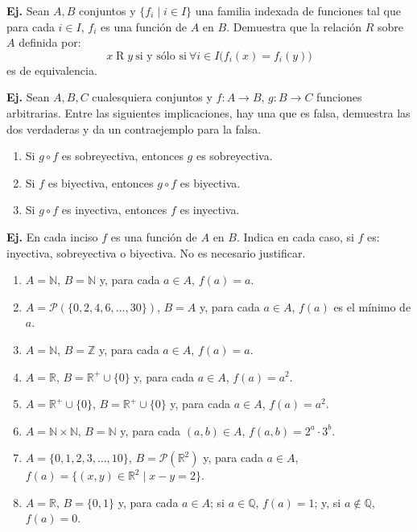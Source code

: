 \documentclass[letterpaper,DIV=14,headsepline,12pt]{scrartcl}
\providecommand\st{\;|\;}
\newcounter{Ejer}
\newcommand{\pts}{}
\newenvironment{ejercicio}[1]{\noindent
    \ifthenelse{\equal{#1}{1}}{\renewcommand{\pts}{\textbf{(#1 pt)}}}{\renewcommand{\pts}{\textbf{(#1 pts)}}}\textbf{Ej. \theEjer} \pts\stepcounter{Ejer}}{\vspace{.3cm}}
\begin{document}
    \begin{ejercicio}{1}
        Sean $A,B$ conjuntos y $\{f_i \st i\in I\}$ una familia indexada de funciones tal que para cada $i \in I$, $f_i$ es una función de $A$ en $B$. Demuestra que la relación $R$ sobre $A$ definida por:
        \[ x \mathrel{R} y \: \text{si y sólo si} \: \forall i \in I \big( f_i(x)=f_i(y) \big) \]
        es de equivalencia.
    \end{ejercicio}

    \begin{ejercicio}{1}
        Sean $A,B,C$ cualesquiera conjuntos y $f\colon A \to B$, $g\colon B \to C$ funciones arbitrarias. Entre las siguientes implicaciones, hay una que es falsa, demuestra las dos verdaderas y da un contraejemplo para la falsa.
        \begin{enumerate}
            \item Si $g \circ f$ es sobreyectiva, entonces $g$ es sobreyectiva.
            \item Si $f$ es biyectiva, entonces $g \circ f$ es biyectiva.
            \item Si $g \circ f$ es inyectiva, entonces $f$ es inyectiva.
        \end{enumerate}
    \end{ejercicio}

    \begin{ejercicio}{1}
        En cada inciso $f$ es una función de $A$ en $B$. Indica en cada caso, si $f$ es: inyectiva, sobreyectiva o biyectiva. No es necesario justificar.
        \begin{enumerate}
            \item $A=\mathbb{N}$, $B=\mathbb{N}$ y, para cada $a \in A$, $f(a)=a$.
            \item $A=\mathscr{P}(\{0,2,4,6,\dotsc,30\})$, $B=A$ y, para cada $a \in A$, $f(a)$ es el mínimo de $a$.
            \item $A=\mathbb{N}$, $B=\mathbb{Z}$ y, para cada $a \in A$, $f(a)=a$.
            \item $A=\mathbb{R}$, $B=\mathbb{R}^+ \cup \{0\}$ y, para cada $a \in A$, $f(a)=a^2$.
            \item $A=\mathbb{R}^+\cup\{0\}$, $B=\mathbb{R}^+ \cup \{0\}$ y, para cada $a \in A$, $f(a)=a^2$.
            \item $A=\mathbb{N} \times \mathbb{N}$, $B=\mathbb{N}$ y, para cada $(a,b)\in A$, $f(a,b)=2^a \cdot 3^b$.
            \item $A=\{0,1,2,3,\dotsc,10\}$, $B=\mathscr{P}(\mathbb{R}^2)$ y, para cada $a \in A$, $f(a)=\{(x,y) \in \mathbb{R}^2 \st x-y=2\}$.
            \item $A=\mathbb{R}$, $B=\{0,1\}$ y, para cada $a \in A$; si $a \in \mathbb{Q}$, $f(a)=1$; y, si $a \notin \mathbb{Q}$, $f(a)=0$.
        \end{enumerate}
    \end{ejercicio}
\end{document}
